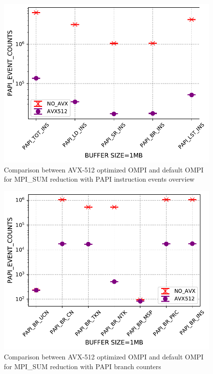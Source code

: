 \documentclass[sigconf,review]{acmart}
\begin{document}
\begin{figure}[h]
    \centering
    \includegraphics[width=\linewidth]{papi_ins.pdf}
    \caption{Comparison between AVX-512 optimized OMPI and default OMPI for MPI\_SUM reduction with PAPI instruction events overview}
    \label{fig:papi_ins}
\end{figure}

\begin{figure}[h]
    \centering
    \includegraphics[width=\linewidth]{papi_br.pdf}
    \caption{Comparison between AVX-512 optimized OMPI and default OMPI for MPI\_SUM reduction with PAPI branch counters}
    \label{fig:papi_br}
\end{figure}
\end{document}
